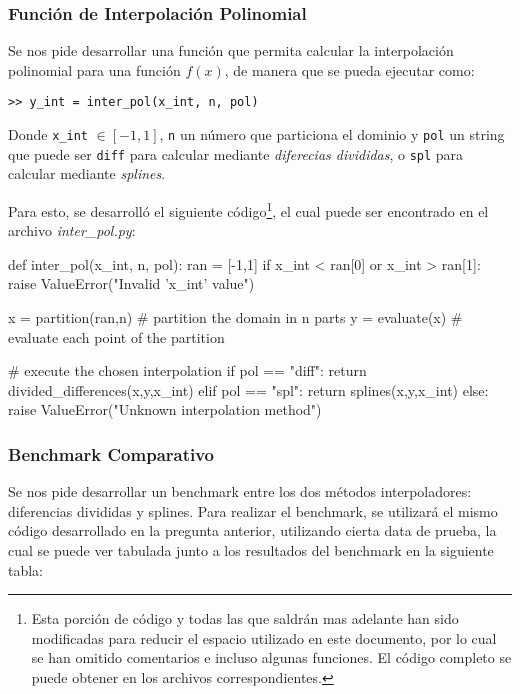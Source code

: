 \documentclass[12pt,letterpaper]{article}
\begin{document}
\subsubsection{Función de Interpolación Polinomial}
Se nos pide desarrollar una función que permita calcular la interpolación polinomial para una función $f(x)$, de manera que se pueda ejecutar como:
\begin{center}
\verb+>> y_int = inter_pol(x_int, n, pol)+
\end{center}

Donde \verb+x_int+ $\in [-1,1]$, \verb+n+ un número que particiona el dominio y \verb+pol+ un string que puede ser \verb+diff+ para calcular mediante \textit{diferecias divididas}, o \verb+spl+ para calcular mediante \textit{splines}.

Para esto, se desarrolló el siguiente código\footnote{Esta porción de código y todas las que saldrán mas adelante han sido modificadas para reducir el espacio utilizado en este documento, por lo cual se han omitido comentarios e incluso algunas funciones. El código completo se puede obtener en los archivos correspondientes.}, el cual puede ser encontrado en el archivo \textit{inter\_pol.py}:
\begin{verbatimtab}[4]
def inter_pol(x_int, n, pol):
	ran = [-1,1]
	if x_int < ran[0] or x_int > ran[1]:
		raise ValueError("Invalid 'x_int' value")
	
	x = partition(ran,n) # partition the domain in n parts
	y = evaluate(x) # evaluate each point of the partition
	
	# execute the chosen interpolation
	if pol == "diff":
		return divided_differences(x,y,x_int)
	elif pol == "spl":
		return splines(x,y,x_int)
	else:
		raise ValueError("Unknown interpolation method")
\end{verbatimtab}

\subsubsection{Benchmark Comparativo}
Se nos pide desarrollar un benchmark entre los dos métodos interpoladores: diferencias divididas y splines. Para realizar el benchmark, se utilizará el mismo código desarrollado en la pregunta anterior, utilizando cierta data de prueba, la cual se puede ver tabulada junto a los resultados del benchmark en la siguiente tabla:
\end{document}
